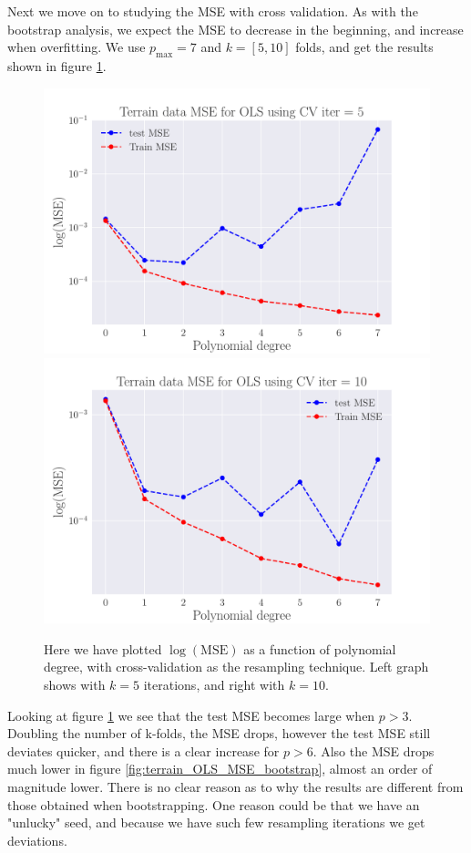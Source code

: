 \documentclass[reprint,english,notitlepage,aps,nobalancelastpage,nofootinbib]{revtex4-1}  %
\begin{document}
Next we move on to studying the MSE with cross validation. As with the bootstrap analysis, we expect the MSE to decrease in the beginning, and increase when overfitting. We use $p_\text{max} = 7$ and $k=[5,10]$ folds, and get the results shown in figure \ref{fig:terrain_OLS_MSE_CV}.

\begin{figure}[H]
	\includegraphics[width=\linewidth]{SRTM_MSE_OLS_n50_pol7_CV_re5_log.pdf}
	\endminipage\hfill
	\includegraphics[width=\linewidth]{SRTM_MSE_OLS_n50_pol7_CV_re10_log.pdf}
	\endminipage
	\caption{Here we have plotted $\log(\text{MSE})$ as a function of polynomial degree, with cross-validation as the resampling technique. Left graph shows with $k=5$ iterations, and right with $k=10$.}
  \label{fig:terrain_OLS_MSE_CV}
\end{figure}
Looking at figure \ref{fig:terrain_OLS_MSE_CV} we see that the test MSE becomes large when $p>3$. Doubling the number of k-folds, the MSE drops, however the test MSE still deviates quicker, and there is a clear increase for $p>6$. Also the MSE drops much lower in figure \ref{fig:terrain_OLS_MSE_bootstrap}, almost an order of magnitude lower. There is no clear reason as to why the results are different from those obtained when bootstrapping. One reason could be that we have an "unlucky" seed, and because we have such few resampling iterations we get deviations.
\end{document}
